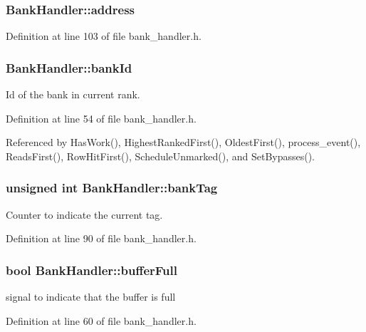 \subsubsection[{address}]{ {\bf BankHandler::address}\hspace{0.3cm}{\tt  [private]}}\label{classBankHandler_bb566f9170d57d78537f4b518e1805f0}




Definition at line 103 of file bank\_\-handler.h.
\subsubsection[{bankId}]{ {\bf BankHandler::bankId}}\label{classBankHandler_9bf29827340b96477710c9a2636e7432}


Id of the bank in current rank. 



Definition at line 54 of file bank\_\-handler.h.

Referenced by HasWork(), HighestRankedFirst(), OldestFirst(), process\_\-event(), ReadsFirst(), RowHitFirst(), ScheduleUnmarked(), and SetBypasses().
\subsubsection[{bankTag}]{\setlength{\rightskip}{0pt plus 5cm}unsigned int {\bf BankHandler::bankTag}}\label{classBankHandler_bbc313936f9271bc7f2a866c07188d2b}


Counter to indicate the current tag. 



Definition at line 90 of file bank\_\-handler.h.
\subsubsection[{bufferFull}]{\setlength{\rightskip}{0pt plus 5cm}bool {\bf BankHandler::bufferFull}}\label{classBankHandler_61eaa92ca677fc7a5a4ae7eeca4e12e9}


signal to indicate that the buffer is full 



Definition at line 60 of file bank\_\-handler.h.

